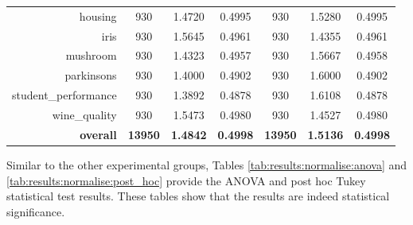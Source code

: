 \begin{table}[htbp]
{\begin{tabular}{rcccccc}
    housing & 930   & \cellcolor[rgb]{ .776,  .937,  .808}\textcolor[rgb]{ 0,  .38,  0}{1.4720} & 0.4995 & 930   & 1.5280 & 0.4995 \\
    iris  & 930   & 1.5645 & 0.4961 & 930   & \cellcolor[rgb]{ .776,  .937,  .808}\textcolor[rgb]{ 0,  .38,  0}{1.4355} & 0.4961 \\
    mushroom & 930   & \cellcolor[rgb]{ .776,  .937,  .808}\textcolor[rgb]{ 0,  .38,  0}{1.4323} & 0.4957 & 930   & 1.5667 & 0.4958 \\
    parkinsons & 930   & \cellcolor[rgb]{ .776,  .937,  .808}\textcolor[rgb]{ 0,  .38,  0}{1.4000} & 0.4902 & 930   & 1.6000 & 0.4902 \\
    student\_performance & 930   & \cellcolor[rgb]{ .776,  .937,  .808}\textcolor[rgb]{ 0,  .38,  0}{1.3892} & 0.4878 & 930   & 1.6108 & 0.4878 \\
    wine\_quality & 930   & 1.5473 & 0.4980 & 930   & \cellcolor[rgb]{ .776,  .937,  .808}\textcolor[rgb]{ 0,  .38,  0}{1.4527} & 0.4980 \\
    \midrule
    \textbf{overall} & \textbf{13950} & \cellcolor[rgb]{ .776,  .937,  .808}\textcolor[rgb]{ 0,  .38,  0}{\textbf{1.4842}} & \textbf{0.4998} & \textbf{13950} & \textbf{1.5136} & \textbf{0.4998} \\
    \end{tabular}%
    }
\end{table}%

Similar to the other experimental groups, Tables \ref{tab:results:normalise:anova} and \ref{tab:results:normalise:post_hoc} provide the ANOVA and post hoc Tukey statistical test results. These tables show that the results are indeed statistical significance.


\begin{table}[htbp]
	\centering
	\caption{ANOVA - Rank - BHH Variant: Normalise}
	\label{tab:results:normalise:anova}%
	\par\bigskip
	
\end{table}


